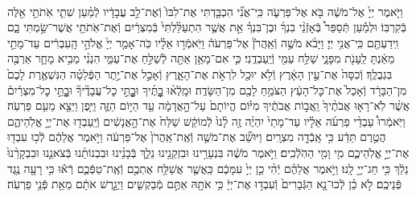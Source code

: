 \documentclass[twoside, openany, parskip=half, 11pt]{book}
\begin{document}
\begin{footnotesize}
\begin{multicols}{2}
\\
וַיֹּ֤אמֶר יְיָ֙ אֶל־מֹשֶׁ֔ה בֹּ֖א אֶל־פַּרְעֹ֑ה כִּֽי־אֲנִ֞י הִכְבַּ֤דְתִּי אֶת־לִבּוֹ֙ וְֿאֶת־לֵ֣ב עֲבָדָ֔יו לְֿמַ֗עַן שִׁתִ֛י אֹֽתֹתַ֥י אֵ֖לֶּה בְּֿקִרְבּֽוֹ׃ וּלְמַ֡עַן תְּֿסַפֵּר֩ בְּֿאָזְֿנֵ֨י בִנְךָ֜ וּבֶן־בִּנְךָ֗ אֵ֣ת אֲשֶׁ֤ר הִתְעַלַּ֨לְתִּי֙ בְּֿמִצְרַ֔יִם וְֿאֶת־אֹֽתֹתַ֖י אֲשֶׁר־שַׂ֣מְתִּי בָ֑ם וִֽידַעְתֶּ֖ם כִּֽי־אֲנִ֥י יְיָ׃ וַיָּבֹ֨א מֹשֶׁ֣ה וְֿאַֽהֲרֹן֘ אֶל־פַּרְעֹה֒ וַיֹּֽאמְֿר֣וּ אֵלָ֗יו כֹּֽה־אָמַ֤ר יְיָ֙ אֱלֹהֵ֣י הָֽעִבְרִ֔ים עַד־מָתַ֣י מֵאַ֔נְתָּ לֵֽעָנֹ֖ת מִפָּנָ֑י שַׁלַּ֥ח עַמִּ֖י וְֿיַֽעַבְדֻֽנִי׃  כִּ֛י אִם־מָאֵ֥ן אַתָּ֖ה לְֿשַׁלֵּ֣חַ אֶת־עַמִּ֑י הִנְנִ֨י מֵבִ֥יא מָחָ֛ר אַרְבֶּ֖ה בִּגְבֻלֶֽךָ׃ וְֿכִסָּה֙ אֶת־עֵ֣ין הָאָ֔רֶץ וְֿלֹ֥א יוּכַ֖ל לִרְאֹ֣ת אֶת־הָאָ֑רֶץ וְֿאָכַ֣ל אֶת־יֶ֣תֶר הַפְּֿלֵטָ֗ה הַנִּשְׁאֶ֤רֶת לָכֶם֙ מִן־הַבָּרָ֔ד וְֿאָכַל֙ אֶת־כׇּל־הָעֵ֔ץ הַצֹּמֵ֥חַ לָכֶ֖ם מִן־הַשָּׂדֶֽה׃ וּמָֽלְֿא֨וּ בׇׇׇׇׇׇׇׇׇׇָתֶּ֜יךָ וּבׇׇׇׇׇׇָתֵּ֣י כׇל־עֲבָדֶ֘יךָ֘ וּבׇׇׇׇׇׇָתֵּ֣י כׇל־מִצְרַ֒יִם֒ אֲשֶׁ֨ר לֹֽא־רָא֤וּ אֲבֹתֶ֨יךָ֙ וַֽאֲב֣וֹת אֲבֹתֶ֔יךָ מִיּ֗וֹם הֱיוֹתָם֙ עַל־הָ֣אֲדָמָ֔ה עַ֖ד הַיּ֣וֹם הַזֶּ֑ה וַיִּ֥פֶן וַיֵּצֵ֖א מֵעִ֥ם פַּרְעֹֽה׃  וַיֹּֽאמְֿרוּ֩ עַבְדֵ֨י פַרְעֹ֜ה אֵלָ֗יו עַד־מָתַי֙ יִהְיֶ֨ה זֶ֥ה לָ֨נוּ֙ לְֿמוֹקֵ֔שׁ שַׁלַּח֙ אֶת־הָ֣אֲנָשִׁ֔ים וְֿיַֽעַבְד֖וּ אֶת־יְיָ֣ אֱלֹֽהֵיהֶ֑ם הֲטֶ֣רֶם תֵּדַ֔ע כִּ֥י אָֽבְֿדָ֖ה מִצְרָֽיִם׃ וַיּוּשַׁ֞ב אֶת־מֹשֶׁ֤ה וְֿאֶֽת־אַֽהֲרֹן֙ אֶל־פַּרְעֹ֔ה וַיֹּ֣אמֶר אֲלֵהֶ֔ם לְֿכ֥וּ עִבְד֖וּ אֶת־יְיָ֣ אֱלֹֽהֵיכֶ֑ם מִ֥י וָמִ֖י הַהֹֽלְֿכִֽים׃ וַיֹּ֣אמֶר מֹשֶׁ֔ה בִּנְעָרֵ֥ינוּ וּבִזְקֵנֵ֖ינוּ נֵלֵ֑ךְ בְּֿבָנֵ֨ינוּ וּבִבְנוֹתֵ֜נוּ בְּֿצֹאנֵ֤נוּ וּבִבְקָרֵ֨נוּ֙ נֵלֵ֔ךְ כִּ֥י חַג־יְיָ֖ לָֽנוּ׃ וַיֹּ֣אמֶר אֲלֵהֶ֗ם יְֿהִ֨י כֵ֤ן יְיָ֙ עִמָּכֶ֔ם כַּֽאֲשֶׁ֛ר אֲשַׁלַּ֥ח אֶתְכֶ֖ם וְֿאֶֽת־טַפְּֿכֶ֑ם רְֿא֕וּ כִּ֥י רָעָ֖ה נֶ֥גֶד פְּֿנֵיכֶֽם׃ לֹ֣א כֵ֗ן לְֿכוּ־נָ֤א הַגְּֿבָרִים֙ וְֿעִבְד֣וּ אֶת־יְיָ֔ כִּ֥י אֹתָ֖הּ אַתֶּ֣ם מְֿבַקְשִׁ֑ים וַיְגָ֣רֶשׁ אֹתָ֔ם מֵאֵ֖ת פְּֿנֵ֥י פַרְעֹֽה׃



\end{multicols}
\end{footnotesize}
\end{document}
